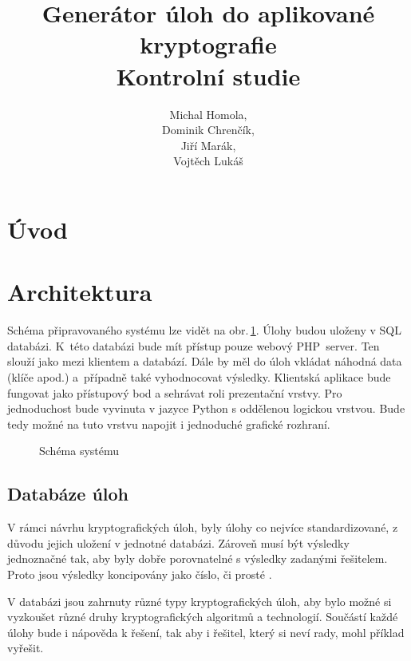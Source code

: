 \documentclass[titlepage]{article}
\title{Generátor úloh do aplikované kryptografie\\Kontrolní studie}
\author{Michal Homola,\\Dominik Chrenčík,\\Jiří Marák,\\Vojtěch Lukáš}
\begin{document}
\maketitle

\tableofcontents

\section*{Úvod}

\section{Architektura}
Schéma připravovaného systému lze vidět na obr.\,\ref{fig:sys}. Úlohy budou uloženy v SQL databázi. K~této databázi bude mít přístup pouze webový PHP~server. Ten slouží jako  mezi klientem a databází. Dále by měl do úloh vkládat náhodná data (klíče apod.) a~případně také vyhodnocovat výsledky. 
Klientská aplikace bude fungovat jako přístupový bod a sehrávat roli prezentační vrstvy. Pro jednoduchost bude vyvinuta v jazyce Python s oddělenou logickou vrstvou. Bude tedy možné na tuto vrstvu napojit i jednoduché grafické rozhraní. 
\begin{figure}[h!]
    \centering
        
    \caption{Schéma systému}
    \label{fig:sys}
\end{figure}




\subsection{Databáze úloh}\label{sec:databaze_uloh}

V rámci návrhu kryptografických úloh, byly úlohy co nejvíce standardizované, z důvodu jejich uložení v jednotné databázi. Zároveň musí být výsledky jednoznačné tak, aby byly dobře porovnatelné s výsledky zadanými řešitelem. Proto jsou výsledky koncipovány jako číslo, či prosté .      

 V databázi jsou zahrnuty různé typy kryptografických úloh, aby bylo možné si vyzkoušet různé druhy kryptografických algoritmů a technologií. Součástí každé úlohy bude i nápověda k řešení, tak aby i řešitel, který si neví rady, mohl příklad vyřešit.
\end{document}
